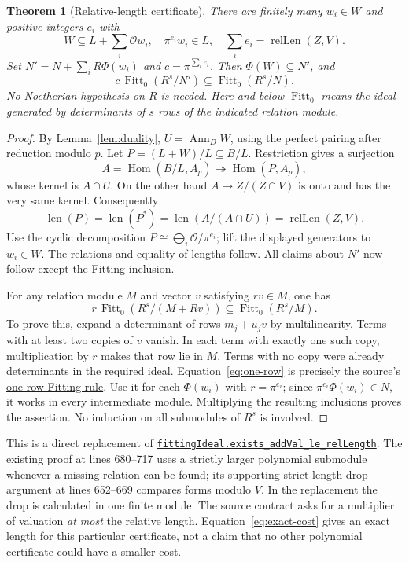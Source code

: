 \documentclass[11pt]{article}
\newtheorem{theorem}{Theorem}[section]
\newcommand{\Ocal}{\mathcal O}
\newcommand{\Fitt}{\operatorname{Fitt}_0}
\newcommand{\len}{\operatorname{len}}
\newcommand{\rl}{\operatorname{relLen}}
\newcommand{\Hom}{\operatorname{Hom}}
\newcommand{\ann}{\operatorname{Ann}}
\newcommand{\src}[3]{\href{https://github.com/VladimirReshetnikov/ProveIt/blob/835c3695d07c0f77060c5cc63f92eeb52a7d21c2/Analysis/GeneralizedRiemannHypothesis/Lean/grh/src/#1.lean\#L#2}{#3}}
\newcommand{\fitlib}[2]{\src{Lib/General/Algebra/FittingIdealsAndLengths}{#1}{#2}}
\begin{document}
\begin{theorem}[Relative-length certificate]\label{thm:relative}
There are finitely many $w_i\in W$ and positive integers $e_i$ with
\[
  W\subseteq L+\sum_i\Ocal w_i,\quad
  \pi^{e_i}w_i\in L,\quad
  \sum_i e_i=\rl(Z,V).
\]
Set $N'=N+\sum_i R\Phi(w_i)$ and $c=\pi^{\sum_i e_i}$. Then $\Phi(W)\subseteq N'$, and
\[
       c\,\Fitt(R^s/N')\subseteq\Fitt(R^s/N).
\]
No Noetherian hypothesis on $R$ is needed. Here and below $\Fitt$ means the ideal generated by determinants of $s$ rows of the indicated relation module.
\end{theorem}
\begin{proof}
By Lemma~\ref{lem:duality}, $U=\ann_D W$, using the perfect pairing after reduction modulo $p$. Let $P=(L+W)/L\subseteq B/L$. Restriction gives a surjection
\[
      A=\Hom(B/L,A_p)\twoheadrightarrow\Hom(P,A_p),
\]
whose kernel is $A\cap U$. On the other hand $A\to Z/(Z\cap V)$ is onto and has the very same kernel. Consequently
\begin{equation}\label{eq:exact-cost}
       \len(P)=\len(P^*)=\len(A/(A\cap U))=\rl(Z,V).
\end{equation}
Use the cyclic decomposition $P\cong\bigoplus_i\Ocal/\pi^{e_i}$; lift the displayed generators to $w_i\in W$. The relations and equality of lengths follow. All claims about $N'$ now follow except the Fitting inclusion.

For any relation module $M$ and vector $v$ satisfying $r v\in M$, one has
\begin{equation}\label{eq:one-row}
 r\,\Fitt(R^s/(M+Rv))\subseteq\Fitt(R^s/M).
\end{equation}
To prove this, expand a determinant of rows $m_j+u_jv$ by multilinearity. Terms with at least two copies of $v$ vanish. In each term with exactly one such copy, multiplication by $r$ makes that row lie in $M$. Terms with no copy were already determinants in the required ideal. Equation~\eqref{eq:one-row} is precisely the source's \fitlib{516}{one-row Fitting rule}. Use it for each $\Phi(w_i)$ with $r=\pi^{e_i}$; since $\pi^{e_i}\Phi(w_i)\in N$, it works in every intermediate module. Multiplying the resulting inclusions proves the assertion. No induction on all submodules of $R^s$ is involved.
\end{proof}

This is a direct replacement of \fitlib{680}{\texttt{fittingIdeal.exists\_addVal\_le\_relLength}}. The existing proof at lines 680--717 uses a strictly larger polynomial submodule whenever a missing relation can be found; its supporting strict length-drop argument at lines 652--669 compares forms modulo $V$. In the replacement the drop is calculated in one finite module. The source contract asks for a multiplier of valuation \emph{at most} the relative length. Equation~\eqref{eq:exact-cost} gives an exact length for this particular certificate, not a claim that no other polynomial certificate could have a smaller cost.
\end{document}
